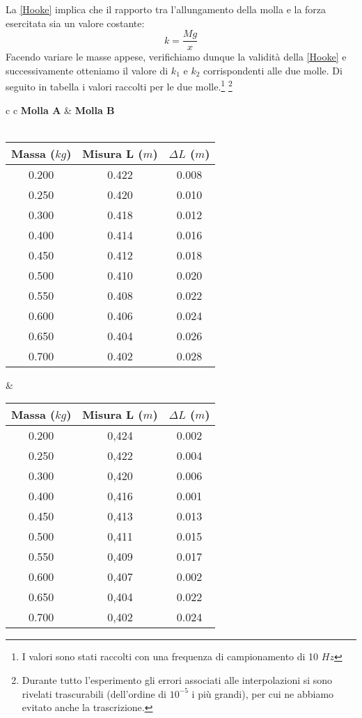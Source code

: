 La \ref{Hooke} implica che il rapporto tra l'allungamento della molla e la forza esercitata sia un valore costante:
$$k=\frac{Mg}{x}$$
Facendo variare le masse appese, verifichiamo dunque la validità della \ref{Hooke} e successivamente otteniamo il valore di $k_1$ e $k_2$ corrispondenti alle due molle.   
Di seguito in tabella i valori raccolti per le due molle.\footnote{I valori sono stati raccolti con una frequenza di campionamento di 10 $Hz$}
\footnote{Durante tutto l'esperimento gli errori associati alle interpolazioni si sono rivelati trascurabili (dell'ordine di $10^{-5}$ i più grandi), per cui ne abbiamo evitato anche la trascrizione.}

\begin{center}

\begin{tabular}{c c}
\textbf{Molla A} & \hspace{2cm} \textbf{Molla B}\\
\\
\begin{tabular}{c|c|c}
Massa ($kg$) & Misura L ($m$) & $\Delta L$ ($m$)\\
\midrule
0.200 & 0.422 & 0.008\\
0.250 & 0.420 & 0.010\\
0.300 & 0.418 & 0.012\\
0.400 & 0.414 & 0.016\\
0.450 & 0.412 & 0.018\\
0.500 & 0.410 & 0.020\\
0.550 & 0.408 & 0.022\\
0.600 & 0.406 & 0.024\\
0.650 & 0.404 & 0.026\\
0.700 & 0.402 & 0.028\\
\end{tabular}

& \hspace{2cm}

\begin{tabular}{c|c|c}
Massa ($kg$) & Misura L ($m$) & $\Delta L$ ($m$)\\
\midrule
0.200 & 0,424 & 0.002\\
0.250 & 0,422 & 0.004\\
0.300 & 0,420 & 0.006\\
0.400 & 0,416 & 0.001\\
0.450 & 0,413 & 0.013\\
0.500 & 0,411 & 0.015\\
0.550 & 0,409 & 0.017\\
0.600 & 0,407 & 0.002\\
0.650 & 0,404 & 0.022\\
0.700 & 0,402 & 0.024\\
\end{tabular}

\end{tabular}

\end{center}

